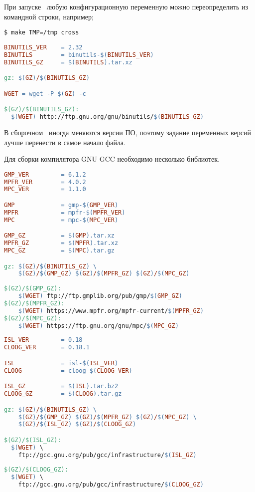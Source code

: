 При запуске \ любую конфигурационную переменную можно переопределить
из командной строки, например;
\begin{lstlisting}
$ make TMP=/tmp cross
\end{lstlisting}

\begin{lstlisting}[language=make]
BINUTILS_VER	= 2.32
BINUTILS		= binutils-$(BINUTILS_VER)
BINUTILS_GZ		= $(BINUTILS).tar.xz

gz: $(GZ)/$(BINUTILS_GZ)

WGET = wget -P $(GZ) -c

$(GZ)/$(BINUTILS_GZ):
  $(WGET) http://ftp.gnu.org/gnu/binutils/$(BINUTILS_GZ)
\end{lstlisting}

В сборочном \ иногда меняются версии ПО, поэтому задание
переменных версий лучше перенести в самое начало файла.

Для сборки компилятора GNU GCC необходимо несколько библиотек.
\begin{lstlisting}[language=make]
GMP_VER			= 6.1.2
MPFR_VER		= 4.0.2
MPC_VER			= 1.1.0

GMP				= gmp-$(GMP_VER)
MPFR			= mpfr-$(MPFR_VER)
MPC				= mpc-$(MPC_VER)

GMP_GZ			= $(GMP).tar.xz
MPFR_GZ			= $(MPFR).tar.xz
MPC_GZ			= $(MPC).tar.gz

gz: $(GZ)/$(BINUTILS_GZ) \
	$(GZ)/$(GMP_GZ) $(GZ)/$(MPFR_GZ) $(GZ)/$(MPC_GZ)
	
$(GZ)/$(GMP_GZ):
	$(WGET) ftp://ftp.gmplib.org/pub/gmp/$(GMP_GZ)
$(GZ)/$(MPFR_GZ):
	$(WGET) https://www.mpfr.org/mpfr-current/$(MPFR_GZ)
$(GZ)/$(MPC_GZ):
	$(WGET) https://ftp.gnu.org/gnu/mpc/$(MPC_GZ)
\end{lstlisting}

\begin{lstlisting}[language=make]
ISL_VER			= 0.18
CLOOG_VER		= 0.18.1

ISL				= isl-$(ISL_VER)
CLOOG			= cloog-$(CLOOG_VER)

ISL_GZ			= $(ISL).tar.bz2
CLOOG_GZ		= $(CLOOG).tar.gz

gz: $(GZ)/$(BINUTILS_GZ) \
	$(GZ)/$(GMP_GZ) $(GZ)/$(MPFR_GZ) $(GZ)/$(MPC_GZ) \
	$(GZ)/$(ISL_GZ) $(GZ)/$(CLOOG_GZ)

$(GZ)/$(ISL_GZ):
  $(WGET) \
    ftp://gcc.gnu.org/pub/gcc/infrastructure/$(ISL_GZ)
    
$(GZ)/$(CLOOG_GZ):
  $(WGET) \
    ftp://gcc.gnu.org/pub/gcc/infrastructure/$(CLOOG_GZ)
\end{lstlisting}

